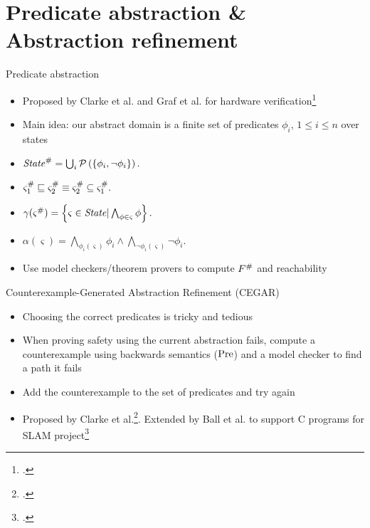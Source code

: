 \documentclass[aspectratio=169,notes]{beamer}
\begin{document}
\section{Predicate abstraction \& Abstraction refinement}
\begin{frame}{Predicate abstraction}
  \begin{itemize}[<+->]
  \item Proposed by Clarke et al. and Graf et al. for hardware verification\footcite{clarke1994model,graf1997construction}
  \item Main idea: our abstract domain is a finite set of predicates $\phi_i,\, 1 \le i\le n$ over states
  \item $\mathit{State}^{\#} = \bigcup_{i}\operatorname{\mathcal{P}}\left(\left\{\phi_i, \neg \phi_i\right\}\right).$
  \item $\varsigma_1^{\#} \sqsubseteq \varsigma_2^{\#} \equiv \varsigma_2^{\#} \subseteq \varsigma_1^{\#}.$
  \item $\gamma(\varsigma^{\#}) = \left\{\varsigma \in \mathit{State} \vert \bigwedge_{\phi \in \varsigma} \phi\right\}.$
  \item $\alpha(\varsigma) = \bigwedge_{\phi_i(\varsigma)} \phi_i \wedge \bigwedge_{\neg\phi_i(\varsigma)} \neg\phi_i .$
  \item Use model checkers/theorem provers to compute $F^{\#}$ and reachability
  \end{itemize}
\end{frame}
\begin{frame}{Counterexample-Generated Abstraction Refinement (CEGAR)}
  \begin{itemize}[<+->]
  \item Choosing the correct predicates is tricky and tedious
  \item When proving safety using the current abstraction fails, compute a counterexample using backwards semantics ($\mathrm{Pre}$) and a model checker to find a path it fails
  \item Add the counterexample to the set of predicates and try again
  \item Proposed by Clarke et al.\footcite{clarke2003counterexample}. Extended by Ball et al. to support C programs for SLAM project\footcite{ball2001automatic,ball2001automatically}
  \end{itemize}
\end{frame}
\end{document}
